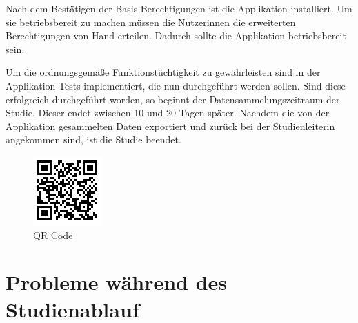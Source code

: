 Nach dem Bestätigen der Basis Berechtigungen ist die Applikation installiert.
Um sie betriebsbereit zu machen müssen die Nutzerinnen die erweiterten Berechtigungen von Hand erteilen.
Dadurch sollte die Applikation betriebsbereit sein.
\par
Um die ordnungsgemäße Funktionstüchtigkeit zu gewährleisten sind in der Applikation Tests implementiert, die nun durchgeführt werden sollen.
Sind diese erfolgreich durchgeführt worden, so beginnt der Datensammelungszeitraum der Studie.
Dieser endet zwischen 10 und 20 Tagen später.
Nachdem die von der Applikation gesammelten Daten exportiert und zurück bei der Studienleiterin angekommen sind, 
ist die Studie beendet.

\begin{figure}[h]
    \centering
    \includegraphics{images/qrcode.png}
    \caption{QR Code}
    \label{fig:qrcode}
\end{figure}


\section{Probleme während des Studienablauf}

